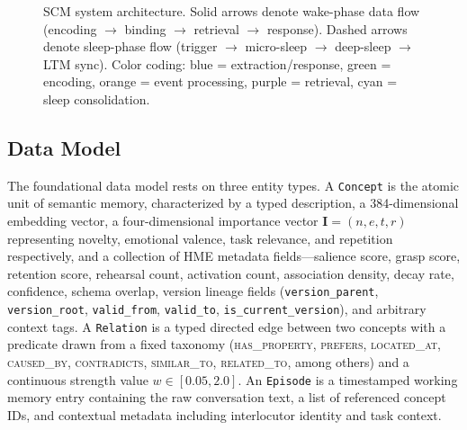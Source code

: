 \documentclass[11pt,twocolumn]{article}
\begin{document}
\begin{figure}[t]
\caption{SCM system architecture. Solid arrows denote wake-phase data flow (encoding $\rightarrow$ binding $\rightarrow$ retrieval $\rightarrow$ response). Dashed arrows denote sleep-phase flow (trigger $\rightarrow$ micro-sleep $\rightarrow$ deep-sleep $\rightarrow$ LTM sync). Color coding: blue = extraction/response, green = encoding, orange = event processing, purple = retrieval, cyan = sleep consolidation.}
\label{fig:arch}
\end{figure}

\subsection{Data Model}

The foundational data model rests on three entity types. A \texttt{Concept} is the atomic unit of semantic memory, characterized by a typed description, a 384-dimensional embedding vector, a four-dimensional importance vector $\mathbf{I} = (n, e, t, r)$ representing novelty, emotional valence, task relevance, and repetition respectively, and a collection of HME metadata fields---salience score, grasp score, retention score, rehearsal count, activation count, association density, decay rate, confidence, schema overlap, version lineage fields (\texttt{version\_parent}, \texttt{version\_root}, \texttt{valid\_from}, \texttt{valid\_to}, \texttt{is\_current\_version}), and arbitrary context tags. A \texttt{Relation} is a typed directed edge between two concepts with a predicate drawn from a fixed taxonomy (\textsc{has\_property}, \textsc{prefers}, \textsc{located\_at}, \textsc{caused\_by}, \textsc{contradicts}, \textsc{similar\_to}, \textsc{related\_to}, among others) and a continuous strength value $w \in [0.05, 2.0]$. An \texttt{Episode} is a timestamped working memory entry containing the raw conversation text, a list of referenced concept IDs, and contextual metadata including interlocutor identity and task context.
\end{document}

